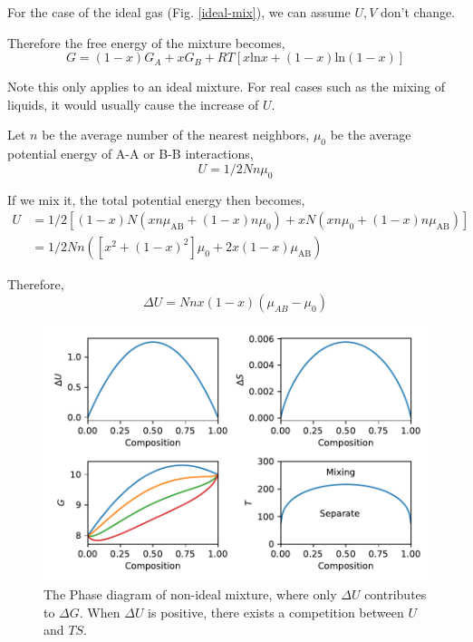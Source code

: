 For the case of the ideal gas (Fig. \ref{ideal-mix}), we can assume $U,V$ don't change.

Therefore the free energy of the mixture becomes,
\begin{equation}
G = (1-x)G_A + xG_B + RT[x\text{ln}x + (1-x)\text{ln}(1-x)]
\end{equation}

Note this only applies to an ideal mixture. For real cases such as the mixing of liquids, it would usually cause the increase of $U$.

Let $n$ be the average number of the nearest neighbors, $\mu_0$ be the average potential energy of A-A or B-B interactions,
\begin{equation}
U = 1/2Nn\mu_0   
\end{equation}

If we mix it, the total potential energy then becomes,
\begin{equation}
\begin{split}
U &= 1/2[(1-x)N(xn\mu_\text{AB} + (1-x)n\mu_0) + xN(xn\mu_0 + (1-x)n\mu_\text{AB})] \\
  &= 1/2Nn([x^2+(1-x)^2]\mu_0 + 2x(1-x)\mu_\text{AB})
\end{split}
\end{equation}

Therefore,
\begin{equation}
\Delta{U} = Nnx(1-x)(\mu_{AB}-\mu_0)
\end{equation}

\begin{figure}[h]
\centering
\includegraphics[width=12cm]{imgs/NonIdeal-Mixture.pdf}
\caption{The Phase diagram of non-ideal mixture, where only $\Delta{U}$ contributes to $\Delta{G}$. When $\Delta{U}$ is positive, there exists 
a competition between $U$ and $TS$.}
\label{fig-non-ideal}
\end{figure}

